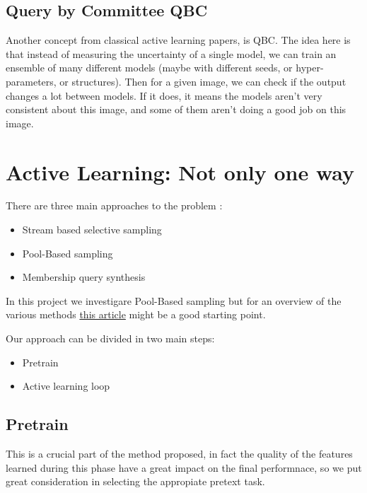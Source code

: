 \documentclass{article}
\begin{document}
\begin{flushleft}
\subsection{Query by Committee QBC}
Another concept from classical active learning papers, is QBC. 
The idea here is that instead of measuring the uncertainty of a single model, 
we can train an ensemble of many different models (maybe with different seeds, 
or hyper-parameters, or structures). Then for a given image, 
we can check if the output changes a lot between models. If it does, 
it means the models aren’t very consistent about this image, 
and some of them aren’t doing a good job on this image.
\section{Active Learning: Not only one way}
There are three main approaches to the problem :
\begin{itemize}
    \item Stream based selective sampling
    \item Pool-Based sampling
    \item Membership query synthesis
\end{itemize}
In this project we investigare Pool-Based sampling but for an overview of the various methods \href{https://www.datarobot.com/blog/active-learning-machine-learning/}{this article} might be a good starting point.
\begin{flushleft}
    Our approach can be divided in two main steps:
\end{flushleft}
\begin{itemize}
    \item Pretrain
    \item Active learning loop
\end{itemize}

\subsection{Pretrain}
This is a crucial part of the method proposed, in fact the quality of the features learned 
during this phase have a great impact on the final performnace, 
so we put great consideration in selecting the appropiate pretext task.


\end{flushleft}
\end{document}
